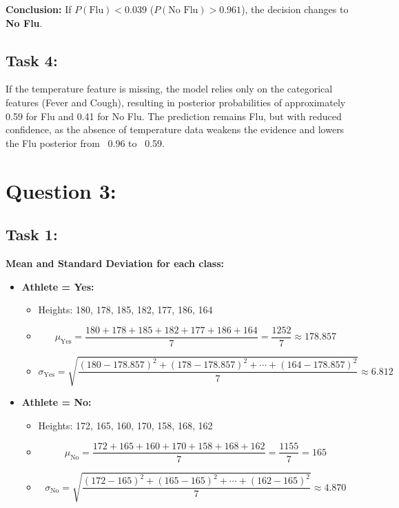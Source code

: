 \documentclass[a4paper,12pt]{article}
\begin{document}
\textbf{Conclusion:} If $P(\text{Flu}) < 0.039$ ($P(\text{No Flu}) > 0.961$), the decision changes to \textbf{No Flu}.



\newpage

\subsection*{Task 4:}

\vspace{1cm}

If the temperature feature is missing, the model relies only on the categorical features (Fever and Cough), resulting in posterior probabilities of approximately 0.59 for Flu and 0.41 for No Flu. The prediction remains Flu, but with reduced confidence, as the absence of temperature data weakens the evidence and lowers the Flu posterior from ~0.96 to ~0.59.


\newpage

\section*{Question 3:}


\subsection*{Task 1:}

\textbf{Mean and Standard Deviation for each class:}

\begin{itemize}
    \item \textbf{Athlete = Yes:}
    \begin{itemize}
        \item Heights: 180, 178, 185, 182, 177, 186, 164
        \item 
        \[
        \mu_{\text{Yes}} = \frac{180 + 178 + 185 + 182 + 177 + 186 + 164}{7} = \frac{1252}{7} \approx 178.857
        \]
        \item 
        \[
        \sigma_{\text{Yes}} = \sqrt{\frac{(180 - 178.857)^2 + (178 - 178.857)^2 + \cdots + (164 - 178.857)^2}{7}} \approx 6.812
        \]
    \end{itemize}

    \item \textbf{Athlete = No:}
    \begin{itemize}
        \item Heights: 172, 165, 160, 170, 158, 168, 162
        \item 
        \[
        \mu_{\text{No}} = \frac{172 + 165 + 160 + 170 + 158 + 168 + 162}{7} = \frac{1155}{7} = 165
        \]
        \item 
        \[
        \sigma_{\text{No}} = \sqrt{\frac{(172 - 165)^2 + (165 - 165)^2 + \cdots + (162 - 165)^2}{7}} \approx 4.870
        \]
    \end{itemize}
\end{itemize}
\end{document}
